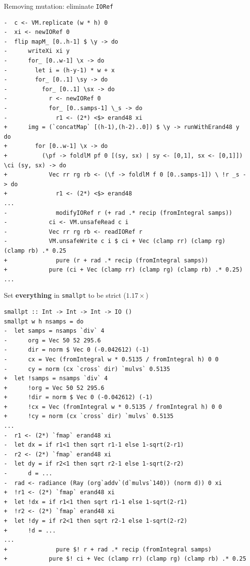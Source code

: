 \documentclass[8pt]{beamer}
\begin{document}
\begin{frame}[fragile]{Removing mutation: eliminate \texttt{IORef}}
\begin{verbatim}
-  c <- VM.replicate (w * h) 0
-  xi <- newIORef 0
-  flip mapM_ [0..h-1] $ \y -> do
-      writeXi xi y
-      for_ [0..w-1] \x -> do
-        let i = (h-y-1) * w + x
-        for_ [0..1] \sy -> do
-          for_ [0..1] \sx -> do
-            r <- newIORef 0
-            for_ [0..samps-1] \_s -> do
-              r1 <- (2*) <$> erand48 xi
+      img = (`concatMap` [(h-1),(h-2)..0]) $ \y -> runWithErand48 y do
+        for [0..w-1] \x -> do
+          (\pf -> foldlM pf 0 [(sy, sx) | sy <- [0,1], sx <- [0,1]]) \ci (sy, sx) -> do
+            Vec rr rg rb <- (\f -> foldlM f 0 [0..samps-1]) \ !r _s -> do
+              r1 <- (2*) <$> erand48
...
-              modifyIORef r (+ rad .* recip (fromIntegral samps))
-            ci <- VM.unsafeRead c i
-            Vec rr rg rb <- readIORef r
-            VM.unsafeWrite c i $ ci + Vec (clamp rr) (clamp rg) (clamp rb) .* 0.25
+              pure (r + rad .* recip (fromIntegral samps))
+            pure (ci + Vec (clamp rr) (clamp rg) (clamp rb) .* 0.25)
...
\end{verbatim}
\end{frame}




\begin{frame}[fragile]{Set \textbf{everything} in \texttt{smallpt} to be strict ($1.17\times$)}
\begin{verbatim}
smallpt :: Int -> Int -> Int -> IO ()
smallpt w h nsamps = do
-  let samps = nsamps `div` 4
-      org = Vec 50 52 295.6
-      dir = norm $ Vec 0 (-0.042612) (-1)
-      cx = Vec (fromIntegral w * 0.5135 / fromIntegral h) 0 0
-      cy = norm (cx `cross` dir) `mulvs` 0.5135
+  let !samps = nsamps `div` 4
+      !org = Vec 50 52 295.6
+      !dir = norm $ Vec 0 (-0.042612) (-1)
+      !cx = Vec (fromIntegral w * 0.5135 / fromIntegral h) 0 0
+      !cy = norm (cx `cross` dir) `mulvs` 0.5135
...
-  r1 <- (2*) `fmap` erand48 xi
-  let dx = if r1<1 then sqrt r1-1 else 1-sqrt(2-r1)
-  r2 <- (2*) `fmap` erand48 xi
-  let dy = if r2<1 then sqrt r2-1 else 1-sqrt(2-r2)
-      d = ...
-  rad <- radiance (Ray (org`addv`(d`mulvs`140)) (norm d)) 0 xi
+  !r1 <- (2*) `fmap` erand48 xi
+  let !dx = if r1<1 then sqrt r1-1 else 1-sqrt(2-r1)
+  !r2 <- (2*) `fmap` erand48 xi
+  let !dy = if r2<1 then sqrt r2-1 else 1-sqrt(2-r2)
+      !d = ...
...
+              pure $! r + rad .* recip (fromIntegral samps)
+            pure $! ci + Vec (clamp rr) (clamp rg) (clamp rb) .* 0.25
\end{verbatim}
\end{frame}
\end{document}
